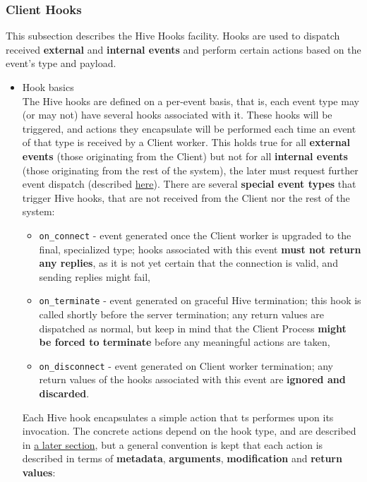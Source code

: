 \documentclass[a4paper]{article}
\begin{document}
\subsubsection{Client Hooks}
\label{sec-7-1-4}
\label{ref-client_hooks}

This subsection describes the Hive Hooks facility. Hooks are used to dispatch received \textbf{external} and \textbf{internal events} and perform certain actions based on the event's type and payload.
\begin{itemize}

\item Hook basics\\
\label{sec-7-1-4-1}%
The Hive hooks are defined on a per-event basis, that is, each event type may (or may not) have several hooks associated with it. These hooks will be triggered, and actions they encapsulate will be performed each time an event of that type is received by a Client worker. This holds true for all \textbf{external events} (those originating from the Client) but not for all \textbf{internal events} (those originating from the rest of the system), the later must request further event dispatch (described \hyperref[sec-8-3]{here}). There are several \textbf{special event types} that trigger Hive hooks, that are not received from the Client nor the rest of the system:


\begin{itemize}
\item \texttt{on\_connect} - event generated once the Client worker is upgraded to the final, specialized type; hooks associated with this event \textbf{must not return any replies}, as it is not yet certain that the connection is valid, and sending replies might fail,
\item \texttt{on\_terminate} - event generated on graceful Hive termination; this hook is called shortly before the server termination; any return values are dispatched as normal, but keep in mind that the Client Process \textbf{might be forced to terminate} before any meaningful actions are taken,
\item \texttt{on\_disconnect} - event generated on Client worker termination; any return values of the hooks associated with this event are \textbf{ignored and discarded}.
\end{itemize}

\noindent
Each Hive hook encapsulates a simple action that ts performes upon its invocation. The concrete actions depend on the hook type, and are described in \hyperref[sec-8-2]{a later section}, but a general convention is kept that each action is described in terms of \textbf{metadata}, \textbf{arguments}, \textbf{modification} and \textbf{return values}:



\end{itemize}
\end{document}
